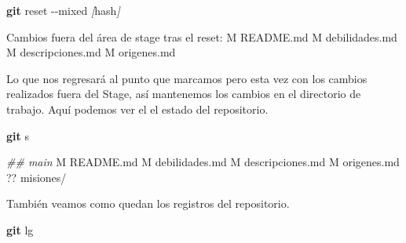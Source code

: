 \documentclass[
]{book}
\newenvironment{Shaded}{\begin{snugshade}}{\end{snugshade}}
\newcommand{\AttributeTok}[1]{\textcolor[rgb]{0.13,0.29,0.53}{#1}}
\newcommand{\CommentTok}[1]{\textcolor[rgb]{0.56,0.35,0.01}{\textit{#1}}}
\newcommand{\ExtensionTok}[1]{#1}
\newcommand{\FunctionTok}[1]{\textcolor[rgb]{0.13,0.29,0.53}{\textbf{#1}}}
\newcommand{\NormalTok}[1]{#1}
\newcommand{\PreprocessorTok}[1]{\textcolor[rgb]{0.56,0.35,0.01}{\textit{#1}}}
\newcommand{\SpecialStringTok}[1]{\textcolor[rgb]{0.31,0.60,0.02}{#1}}
\begin{document}
\begin{Shaded}
\begin{Highlighting}[]
\FunctionTok{git}\NormalTok{ reset }\AttributeTok{{-}{-}mixed} \PreprocessorTok{[}\SpecialStringTok{hash}\PreprocessorTok{]}
\end{Highlighting}
\end{Shaded}

\begin{Shaded}
\begin{Highlighting}[]
\ExtensionTok{Cambios}\NormalTok{ fuera del área de stage tras el reset:}
\ExtensionTok{M}\NormalTok{   README.md}
\ExtensionTok{M}\NormalTok{   debilidades.md}
\ExtensionTok{M}\NormalTok{   descripciones.md}
\ExtensionTok{M}\NormalTok{   origenes.md}
\end{Highlighting}
\end{Shaded}

Lo que nos regresará al punto que marcamos pero esta vez con los cambios realizados fuera del Stage, así mantenemos los cambios en el directorio de trabajo. Aquí podemos ver el el estado del repositorio.

\begin{Shaded}
\begin{Highlighting}[]
\FunctionTok{git}\NormalTok{ s}
\end{Highlighting}
\end{Shaded}

\begin{Shaded}
\begin{Highlighting}[]
\CommentTok{\#\# main}
 \ExtensionTok{M}\NormalTok{ README.md}
 \ExtensionTok{M}\NormalTok{ debilidades.md}
 \ExtensionTok{M}\NormalTok{ descripciones.md}
 \ExtensionTok{M}\NormalTok{ origenes.md}
\ExtensionTok{??}\NormalTok{ misiones/}
\end{Highlighting}
\end{Shaded}

También veamos como quedan los registros del repositorio.

\begin{Shaded}
\begin{Highlighting}[]
\FunctionTok{git}\NormalTok{ lg}
\end{Highlighting}
\end{Shaded}
\end{document}
